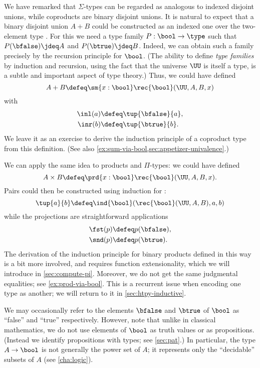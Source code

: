 We have remarked that $\Sigma$-types can be regarded as analogous to indexed disjoint unions, while coproducts are binary disjoint unions.
It is natural to expect that a binary disjoint union $A+B$ could be constructed as an indexed one over the two-element type \bool.
For this we need a type family $P:\bool\to\type$ such that $P(\bfalse)\jdeq A$ and $P(\btrue)\jdeq B$.
Indeed, we can obtain such a family precisely by the recursion principle for $\bool$.
%
(The ability to define \emph{type families} by induction and recursion, using the fact that the universe $\UU$ is itself a type, is a subtle and important aspect of type theory.)
Thus, we could have defined
%
\[ A + B \defeq \sm{x:\bool} \rec{\bool}(\UU,A,B,x) \]
with
\begin{align*}
  \inl(a) &\defeq \tup{\bfalse}{a}, \\
  \inr(b) &\defeq \tup{\btrue}{b}.
\end{align*}
We leave it as an exercise to derive the induction principle of a coproduct type from this definition.
(See also \cref{ex:sum-via-bool,sec:appetizer-univalence}.)

We can apply the same idea to products and $\Pi$-types: we could have defined
\[ A \times B \defeq \prd{x:\bool}\rec{\bool}(\UU,A,B,x). \]
Pairs could then be constructed using induction for \bool:
\[ \tup{a}{b} \defeq \ind{\bool}(\rec{\bool}(\UU,A,B),a,b) \]
while the projections are straightforward applications
\begin{align*}
  \fst(p) &\defeq p(\bfalse), \\
  \snd(p) &\defeq p(\btrue).
\end{align*}
The derivation of the induction principle for binary products defined in this way is a bit more involved, and requires function extensionality, which we will introduce in \cref{sec:compute-pi}.
Moreover, we do not get the same judgmental equalities; see \cref{ex:prod-via-bool}.
This is a recurrent issue when encoding one type as another; we will return to it in \cref{sec:htpy-inductive}. 

We may occasionally refer to the elements $\bfalse$ and $\btrue$ of $\bool$ as ``false'' and ``true'' respectively.
However, note that unlike in classical mathematics, we do not use elements of $\bool$ as truth values
%
or as propositions.
(Instead we identify propositions with types; see \cref{sec:pat}.)
In particular, the type $A \to \bool$ is not generally the power set of $A$; it represents only the ``decidable'' subsets of $A$ (see \cref{cha:logic}).
%

